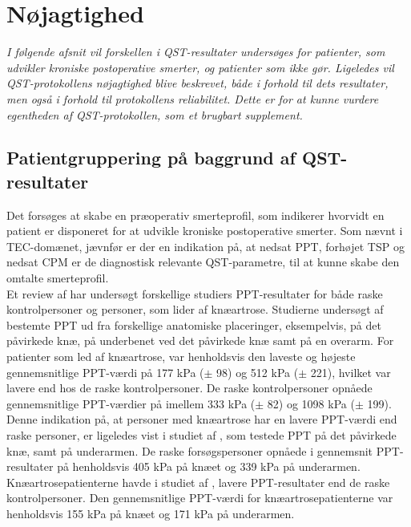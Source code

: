 \section{Nøjagtighed}
\textit{I følgende afsnit vil forskellen i QST-resultater undersøges for patienter, som udvikler kroniske postoperative smerter, og patienter som ikke gør. Ligeledes vil QST-protokollens nøjagtighed blive beskrevet, både i forhold til dets resultater, men også i forhold til protokollens reliabilitet. Dette er for at kunne vurdere egentheden af QST-protokollen, som et brugbart supplement.}

\subsection{Patientgruppering på baggrund af QST-resultater}
Det forsøges at skabe en præoperativ smerteprofil, som indikerer hvorvidt en patient er disponeret for at udvikle kroniske postoperative smerter. Som nævnt i TEC-domænet, jævnfør  er der en indikation på, at nedsat PPT, forhøjet TSP og nedsat CPM er de diagnostisk relevante QST-parametre, til at kunne skabe den omtalte smerteprofil. \\
Et review af  har undersøgt forskellige studiers PPT-resultater for både raske kontrolpersoner og personer, som lider af knæartrose. Studierne undersøgt af  bestemte PPT ud fra forskellige anatomiske placeringer, eksempelvis, på det påvirkede knæ, på underbenet ved det påvirkede knæ samt på en overarm. For patienter som led af knæartrose, var henholdsvis den laveste og højeste gennemsnitlige PPT-værdi på 177 kPa ($\pm$ 98) og 512 kPa ($\pm$ 221), hvilket var lavere end hos de raske kontrolpersoner. De raske kontrolpersoner opnåede gennemsnitlige PPT-værdier på imellem 333 kPa ($\pm$ 82) og 1098 kPa ($\pm$ 199). \citep{Suokas2012} Denne indikation på, at personer med knæartrose har en lavere PPT-værdi end raske personer, er ligeledes vist i studiet af , som testede PPT på det påvirkede knæ, samt på underarmen. De raske forsøgspersoner opnåede i gennemsnit PPT-resultater på henholdsvis 405 kPa på knæet og 339 kPa på underarmen. Knæartrosepatienterne havde i studiet af , lavere PPT-resultater end de raske kontrolpersoner. Den gennemsnitlige PPT-værdi for knæartrosepatienterne var henholdsvis 155 kPa på knæet og 171 kPa på underarmen. \citep{Wylde2013} 

